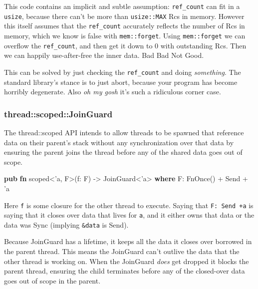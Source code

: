 \documentclass[a4paper,]{book}
\newenvironment{Shaded}{\begin{snugshade}}{\end{snugshade}}
\newcommand{\KeywordTok}[1]{\textcolor[rgb]{0.13,0.29,0.53}{\textbf{{#1}}}}
\newcommand{\OtherTok}[1]{\textcolor[rgb]{0.56,0.35,0.01}{{#1}}}
\newcommand{\BuiltInTok}[1]{{#1}}
\newcommand{\NormalTok}[1]{{#1}}
\begin{document}
This code contains an implicit and subtle assumption:
\texttt{ref\_count} can fit in a \texttt{usize}, because there can't be
more than \texttt{usize::MAX} Rcs in memory. However this itself assumes
that the \texttt{ref\_count} accurately reflects the number of Rcs in
memory, which we know is false with \texttt{mem::forget}. Using
\texttt{mem::forget} we can overflow the \texttt{ref\_count}, and then
get it down to 0 with outstanding Rcs. Then we can happily
use-after-free the inner data. Bad Bad Not Good.

This can be solved by just checking the \texttt{ref\_count} and doing
\emph{something}. The standard library's stance is to just abort,
because your program has become horribly degenerate. Also \emph{oh my
gosh} it's such a ridiculous corner case.

\subsubsection{thread::scoped::JoinGuard}\label{threadscopedjoinguard}

The thread::scoped API intends to allow threads to be spawned that
reference data on their parent's stack without any synchronization over
that data by ensuring the parent joins the thread before any of the
shared data goes out of scope.

\begin{Shaded}
\begin{Highlighting}[]
\KeywordTok{pub} \KeywordTok{fn} \NormalTok{scoped<}\OtherTok{'a}\NormalTok{, F>(f: F) -> JoinGuard<}\OtherTok{'a}\NormalTok{>}
    \KeywordTok{where} \NormalTok{F: }\BuiltInTok{FnOnce}\NormalTok{() + }\BuiltInTok{Send} \NormalTok{+ }\OtherTok{'a}
\end{Highlighting}
\end{Shaded}

Here \texttt{f} is some closure for the other thread to execute. Saying
that \texttt{F:\ Send\ +\textquotesingle{}a} is saying that it closes
over data that lives for \texttt{\textquotesingle{}a}, and it either
owns that data or the data was Sync (implying \texttt{\&data} is Send).

Because JoinGuard has a lifetime, it keeps all the data it closes over
borrowed in the parent thread. This means the JoinGuard can't outlive
the data that the other thread is working on. When the JoinGuard
\emph{does} get dropped it blocks the parent thread, ensuring the child
terminates before any of the closed-over data goes out of scope in the
parent.
\end{document}
